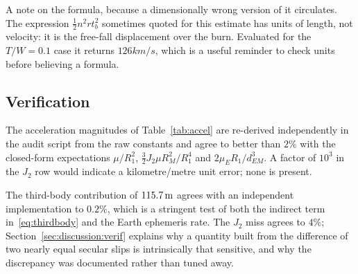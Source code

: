 A note on the formula, because a dimensionally wrong version of it circulates.
The expression $\tfrac12 n^2 r t_b^2$ sometimes quoted for this estimate has
units of length, not velocity: it is the free-fall displacement over the burn.
Evaluated for the $T/W = 0.1$ case it returns $126\unit{km/s}$, which is a
useful reminder to check units before believing a formula.

\subsection{Verification}

The acceleration magnitudes of Table~\ref{tab:accel} are re-derived
independently in the audit script from the raw constants and agree to better
than $2\%$ with the closed-form expectations $\mu/R_1^2$,
$\tfrac32 J_2\mu R_M^2/R_1^4$ and $2\mu_E R_1/d_{EM}^3$. A factor of $10^3$ in
the $J_2$ row would indicate a kilometre/metre unit error; none is present.

The third-body contribution of $115.7\,\mathrm{m}$ agrees with an independent
implementation to $0.2\%$, which is a stringent test of both the indirect term
in~\eqref{eq:thirdbody} and the Earth ephemeris rate. The $J_2$ miss agrees to
$4\%$; Section~\ref{sec:discussion:verif} explains why a quantity built from the
difference of two nearly equal secular slips is intrinsically that sensitive,
and why the discrepancy was documented rather than tuned away.
